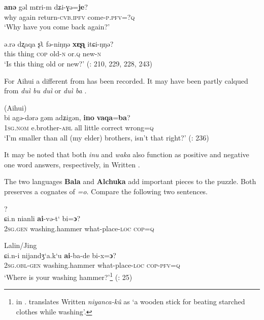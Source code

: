     \ex
    \gll \textbf{{an}}\textbf{{ə}} gəl  mɛri-m      dʑi-ɣə{=}\textbf{{je}}?\\
    why  again  return-\textsc{cvb}.\textsc{ipfv}  come-\textsc{p.pfv}=?\textsc{q}\\
    \glt ‘Why have you come back again?’
    
    \ex
    \gll ə.rə dʐaqa  ʂʅ  fə-{niŋŋə} \textbf{{xɛʂʅ}} {itɕi-ŋŋə?}\\
    this  thing  \textsc{cop}  old-\textsc{n}    or.\textsc{q}  new-\textsc{n}\\
    \glt ‘Is this thing old or new?’ (\citealt{WangQingfeng2005}: 210, 229, 228, 243)
    \z
    \z 

For Aihui  a  different from  has been recorded. It may have been partly calqued from  \textit{duì bu duì}  or \textit{duì ba} .

\newpage 
\ea%
    \label{ex:tungu:75}
     (Aihui)\\
    \gll bi    agə-dərə  gəm  adʑigən, \textbf{{ino}} \textbf{{vaqa}}{=}\textbf{{ba}}?\\
    1\textsc{sg}.\textsc{nom}  e.brother-\textsc{abl}  all  little    correct  wrong=\textsc{q}\\
    \glt ‘I’m smaller than all (my elder) brothers, isn’t that right?’ (\citealt{WangQingfeng2005}: 236)
    \z

It may be noted that both \textit{inu} and \textit{waka} also function as positive and negative one word answers, respectively, in Written .

The two languages \textbf{Bala} and \textbf{Alchuka} add important pieces to the puzzle. Both preserves a cognates of  \textit{=o}. Compare the following two sentences.

\ea%
    \label{ex:tungu:76}
    ?\\
    \gll ɕi.n    nianli \textbf{{ai}}-və-t‘      bi=\textbf{{ɔ}}?\\
    2\textsc{sg}.\textsc{gen}  washing.hammer  what-place-\textsc{loc}  \textsc{cop}=\textsc{q}\\
    \glt
    \z

\ea%
    \label{ex:tungu:77}
    Lalin/Jing \\
    \gll ɕi.n-i    nijandʒ‘a.k‘u \textbf{{ai}}-ba-de    bi-x=\textbf{{ɔ}}?\\
    2\textsc{sg}.\textsc{obl}-\textsc{gen}  washing.hammer  what-place-\textsc{loc}  \textsc{cop}-\textsc{pfv}=\textsc{q}\\
    \glt ‘Where is your washing hammer?’\footnote{ in . \citet{Norman2013} translates Written  \textit{niyanca-kû} as ‘a wooden stick for beating starched clothes while washing’.} (\citealt{MuYejun1987}: 25)
    \z

